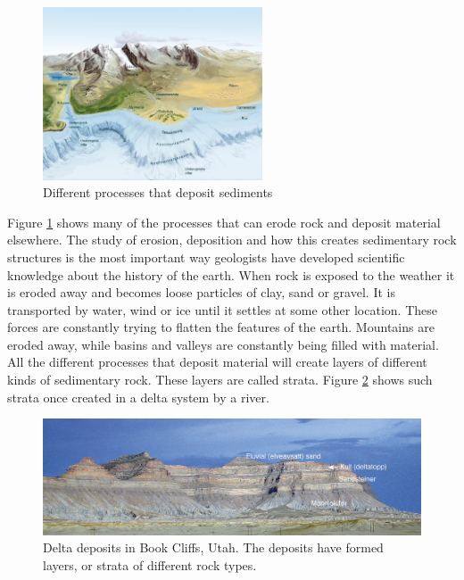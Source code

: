 \documentclass[a4paper,12pt]{report}
\begin{document}
\begin{figure}
  \begin{center}
    \includegraphics[width=0.58\textwidth]{thesis/geo/geoDeposit.png}
  \end{center}
  \caption{Different processes that deposit sediments}
  \label{fig:geoDeposit}
\end{figure}


Figure \ref{fig:geoDeposit} shows many of the processes that can erode rock and deposit material elsewhere. The study of erosion, deposition and how this creates sedimentary rock structures is the most important way geologists have developed scientific knowledge about the history of the earth. When rock is exposed to the weather it is eroded away and becomes loose particles of clay, sand or gravel. It is transported by water, wind or ice until it settles at some other location. These forces are constantly trying to flatten the features of the earth. Mountains are eroded away, while basins and valleys are constantly being filled with material. All the different processes that deposit material will create layers of different kinds of sedimentary rock. These layers are called strata. Figure \ref{fig:strata} shows such strata once created in a delta system by a river.


\begin{figure}
 \includegraphics[width=\linewidth]{thesis/geo/strata.png}
 \caption{Delta deposits in Book Cliffs, Utah. The deposits have formed layers, or strata of different rock types.}
 \label{fig:strata}
\end{figure}
\end{document}

